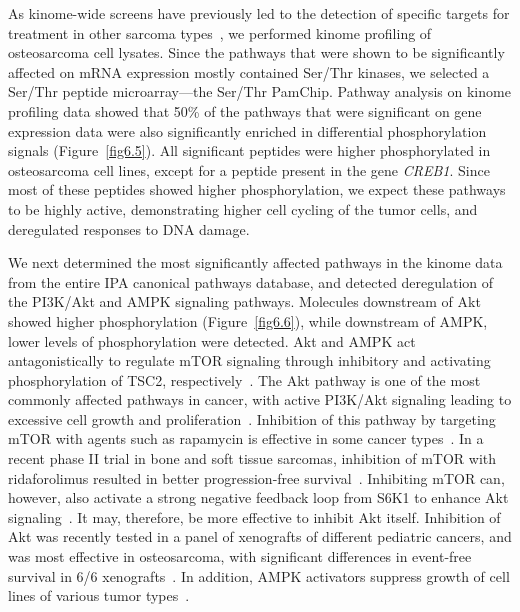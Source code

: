 As kinome\hyp{}wide screens have previously led to the detection of specific targets for treatment in other sarcoma types~\cite{schrage2009kinome,willems2010kinome}, we performed kinome profiling of osteosarcoma cell lysates. Since the pathways that were shown to be significantly affected on mRNA expression mostly contained Ser/Thr kinases, we selected a Ser/Thr peptide microarray---the Ser/Thr PamChip\textregistered. Pathway analysis on kinome profiling data showed that 50\% of the pathways that were significant on gene expression data were also significantly enriched in differential phosphorylation signals (Figure~\ref{fig6.5}). All significant peptides were higher phosphorylated in osteosarcoma cell lines, except for a peptide present in the gene {\it CREB1}. Since most of these peptides showed higher phosphorylation, we expect these pathways to be highly active, demonstrating higher cell cycling of the tumor cells, and deregulated responses to DNA damage.

We next determined the most significantly affected pathways in the kinome data from the entire IPA canonical pathways database, and detected deregulation of the PI3K/Akt and AMPK signaling pathways. Molecules downstream of Akt showed higher phosphorylation (Figure~\ref{fig6.6}), while downstream of AMPK, lower levels of phosphorylation were detected. Akt and AMPK act antagonistically to regulate mTOR signaling through inhibitory and activating phosphorylation of TSC2, respectively~\cite{memmott2009akt}. The Akt pathway is one of the most commonly affected pathways in cancer, with active PI3K/Akt signaling leading to excessive cell growth and proliferation~\cite{engelman2006evolution,manning2007akt}. Inhibition of this pathway by targeting mTOR with agents such as rapamycin is effective in some cancer types~\cite{guertin2007defining}. In a recent phase II trial in bone and soft tissue sarcomas, inhibition of mTOR with ridaforolimus resulted in better progression\hyp{}free survival~\cite{chawla2012phase}. Inhibiting mTOR can, however, also activate a strong negative feedback loop from S6K1 to enhance Akt signaling~\cite{engelman2006evolution,guertin2007defining}. It may, therefore, be more effective to inhibit Akt itself. Inhibition of Akt was recently tested in a panel of xenografts of different pediatric cancers, and was most effective in osteosarcoma, with significant differences in event\hyp{}free survival in 6/6 xenografts~\cite{gorlick2012testing}. In addition, AMPK activators suppress growth of cell lines of various tumor types~\cite{vakana2012targeting}.

